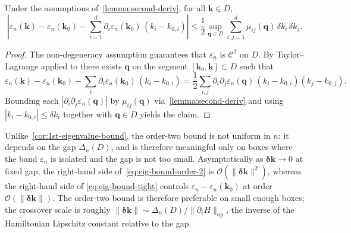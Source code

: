 \documentclass[11pt]{article}
\numberwithin{equation}{section}
\begin{document}
\begin{corollary}\label{cor:2nd-eigenvalue-bound}
    Under the assumptions of~\autoref{lemma:second-deriv}, for all
    \(\mathbf{k} \in D\),
    \begin{equation}
        \left| \varepsilon_n(\mathbf{k}) - \varepsilon_n(\mathbf{k}_0)
        - \sum_{i=1}^d \partial_i \varepsilon_n(\mathbf{k}_0)\,(k_i - k_{0,i})
        \right|
        \leq \frac{1}{2} \sup_{\mathbf{q} \in D}
        \sum_{i,j=1}^d \mu_{ij}(\mathbf{q})\, \delta k_i\, \delta k_j.
        \label{eq:eig-bound-order-2}
    \end{equation}
\end{corollary}
\begin{proof}
    The non-degeneracy assumption guarantees that \(\varepsilon_n\) is
    \(\mathcal{C}^2\) on \(D\). By Taylor--Lagrange applied to
    there exists \(\mathbf{q}\) on the segment
    \([\mathbf{k}_0, \mathbf{k}] \subset D\) such that
    \begin{equation}
        \varepsilon_n(\mathbf{k}) - \varepsilon_n(\mathbf{k}_0)
        - \sum_i \partial_i \varepsilon_n(\mathbf{k}_0)\,(k_i - k_{0,i})
        = \frac{1}{2} \sum_{i,j}
        \partial_i \partial_j \varepsilon_n(\mathbf{q})\,(k_i - k_{0,i})(k_j - k_{0,j}).
    \end{equation}
    Bounding each \(|\partial_i \partial_j \varepsilon_n(\mathbf{q})|\) by
    \(\mu_{ij}(\mathbf{q})\) via~\autoref{lemma:second-deriv} and using
    \(|k_i - k_{0,i}| \leq \delta k_i\) together with \(\mathbf{q} \in D\) yields the
    claim.
\end{proof}

\begin{remark}
    Unlike~\autoref{cor:1st-eigenvalue-bound}, the order-two bound is not uniform
    in \(n\): it depends on the gap \(\Delta_n(D)\), and is therefore meaningful
    only on boxes where the band \(\varepsilon_n\) is isolated and the gap is
    not too small. Asymptotically as \(\bm{\delta\mathbf{k}} \to 0\) at fixed
    gap, the right-hand side of~\eqref{eq:eig-bound-order-2} is
    \(\mathcal{O}(\|\bm{\delta\mathbf{k}}\|^2)\), whereas the right-hand side of
    \eqref{eq:eig-bound-tight} controls \(\varepsilon_n - \varepsilon_n(\mathbf{k}_0)\)
    at order \(\mathcal{O}(\|\bm{\delta\mathbf{k}}\|)\). The order-two bound is
    therefore preferable on small enough boxes; the crossover scale is roughly
    \(\|\bm{\delta\mathbf{k}}\| \sim \Delta_n(D) /
    \|\partial_i H\|_\mathrm{op}\), the inverse of the Hamiltonian Lipschitz
    constant relative to the gap.
\end{remark}
\end{document}

